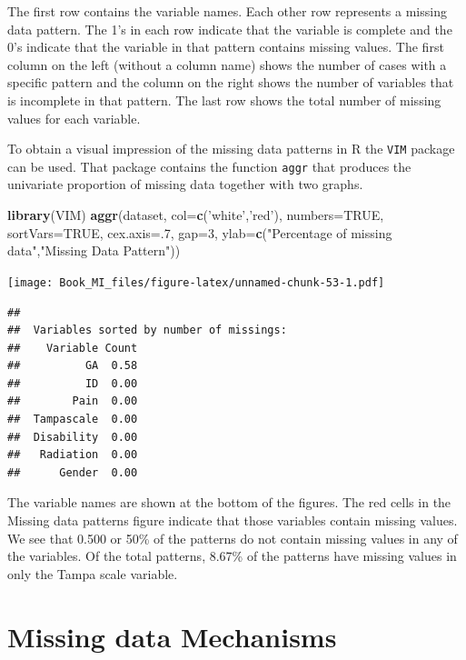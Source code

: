 \documentclass[]{book}
\newenvironment{Shaded}{\begin{snugshade}}{\end{snugshade}}
\newcommand{\KeywordTok}[1]{\textcolor[rgb]{0.13,0.29,0.53}{\textbf{#1}}}
\newcommand{\DataTypeTok}[1]{\textcolor[rgb]{0.13,0.29,0.53}{#1}}
\newcommand{\DecValTok}[1]{\textcolor[rgb]{0.00,0.00,0.81}{#1}}
\newcommand{\StringTok}[1]{\textcolor[rgb]{0.31,0.60,0.02}{#1}}
\newcommand{\OtherTok}[1]{\textcolor[rgb]{0.56,0.35,0.01}{#1}}
\newcommand{\NormalTok}[1]{#1}
\begin{document}
The first row contains the variable names. Each other row represents a
missing data pattern. The 1's in each row indicate that the variable is
complete and the 0's indicate that the variable in that pattern contains
missing values. The first column on the left (without a column name)
shows the number of cases with a specific pattern and the column on the
right shows the number of variables that is incomplete in that pattern.
The last row shows the total number of missing values for each variable.

To obtain a visual impression of the missing data patterns in R the
\texttt{VIM} package can be used. That package contains the function
\texttt{aggr} that produces the univariate proportion of missing data
together with two graphs.

\begin{Shaded}
\begin{Highlighting}[]
\KeywordTok{library}\NormalTok{(VIM)}
\KeywordTok{aggr}\NormalTok{(dataset, }\DataTypeTok{col=}\KeywordTok{c}\NormalTok{(}\StringTok{'white'}\NormalTok{,}\StringTok{'red'}\NormalTok{), }\DataTypeTok{numbers=}\OtherTok{TRUE}\NormalTok{, }\DataTypeTok{sortVars=}\OtherTok{TRUE}\NormalTok{, }\DataTypeTok{cex.axis=}\NormalTok{.}\DecValTok{7}\NormalTok{, }\DataTypeTok{gap=}\DecValTok{3}\NormalTok{, }\DataTypeTok{ylab=}\KeywordTok{c}\NormalTok{(}\StringTok{"Percentage of missing data"}\NormalTok{,}\StringTok{"Missing Data Pattern"}\NormalTok{))}
\end{Highlighting}
\end{Shaded}

\texttt{[image: Book\_MI\_files/figure-latex/unnamed-chunk-53-1.pdf]}

\begin{verbatim}
## 
##  Variables sorted by number of missings: 
##    Variable Count
##          GA  0.58
##          ID  0.00
##        Pain  0.00
##  Tampascale  0.00
##  Disability  0.00
##   Radiation  0.00
##      Gender  0.00
\end{verbatim}

The variable names are shown at the bottom of the figures. The red cells
in the Missing data patterns figure indicate that those variables
contain missing values. We see that 0.500 or 50\% of the patterns do not
contain missing values in any of the variables. Of the total patterns,
8.67\% of the patterns have missing values in only the Tampa scale
variable.

\section{Missing data Mechanisms}\label{missing-data-mechanisms}
\end{document}
